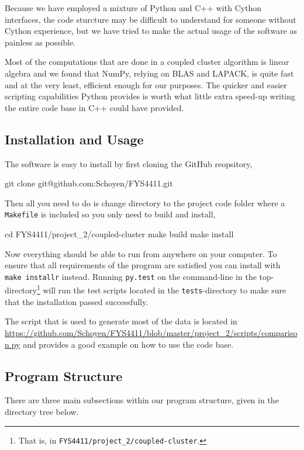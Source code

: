 \documentclass[
    a4paper, aps, twocolumn, floatfix, superscriptaddress,
    nofootinbib]{revtex4-1}
\newcommand{\1}{\mathds{1}}
\begin{document}
    Because we have employed a mixture of Python and C++ with Cython interfaces,
    the code sturcture may be difficult to understand for someone without Cython
    experience, but we have tried to make the actual usage of the software as
    painless as possible.

    Most of the computations that are done in a coupled cluster algorithm is
    linear algebra and we found that NumPy, relying on BLAS and LAPACK, is quite
    fast and at the very least, efficient enough for our purposes. The quicker
    and easier scripting capabilities Python provides is worth what little extra
    speed-up writing the entire code base in C++ could have provided.

    \subsection{Installation and Usage}

        The software is easy to install by first cloning the GitHub reopsitory,
        \begin{bash}
            git clone git@github.com:Schoyen/FYS4411.git
        \end{bash}
        Then all you need to do is change directory to the project code folder
        where a \lstinline{Makefile} is included so you only need to build and
        install,
        \begin{bash}
            cd FYS4411/project_2/coupled-cluster
            make build
            make install
        \end{bash}
        Now everything should be able to run from anywhere on your computer.  To
        ensure that all requirements of the program are satisfied you can
        install with \texttt{make installr} instead. Running
        \texttt{py.test} on the command-line in the
        top-directory\footnote{That is, in
        \texttt{FYS4411/project\_2/coupled-cluster}.} will run the test scripts
        located in the \texttt{tests}-directory to make sure that the
        installation passed successfully.

        The script that is used to generate most of the data is located in
        \url{https://github.com/Schoyen/FYS4411/blob/master/project_2/scripts/comparison.py}
        and provides a good example on how to use the code base.

    \subsection{Program Structure}
        There are three main subsections within our program structure, given in
        the directory tree below.
\end{document}

